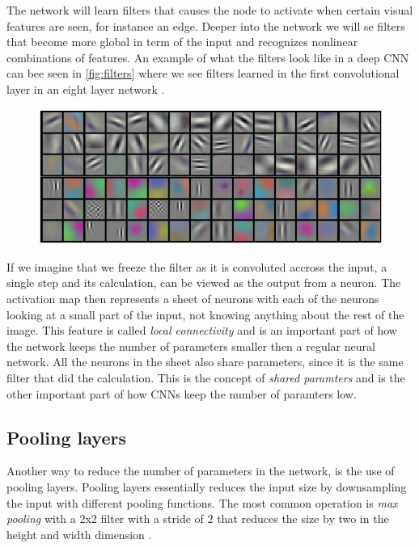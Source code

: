 The network will learn filters that causes the node to activate when certain visual features are seen, for instance an edge. Deeper into the network we will se filters that become more global in term of the input and recognizes nonlinear combinations of features. An example of what the filters look like in a deep CNN can bee seen in \autoref{fig:filters} where we see filters learned in the first convolutional layer in an eight layer network \cite{Krizhevsky2012}.

\begin{figure}[H]
	\centering
	\includegraphics[width=\linewidth]{fig/filters.png}
	\label{fig:filters}
\end{figure}
If we imagine that we freeze the filter as it is convoluted accross the input, a single step and its calculation, can be viewed as the output from a neuron. The activation map then represents a sheet of neurons with each of the neurons looking at a small part of the input, not knowing anything about the rest of the image. This feature is called \emph{local connectivity} and is an important part of how the network keeps the number of parameters smaller then a regular neural network. All the neurons in the sheet also share parameters, since it is the same filter that did the calculation. This is the concept of \emph{shared paramters} and is the other important part of how CNNs keep the number of paramters low.

\subsection{Pooling layers}
Another way to reduce the number of parameters in the network, is the use of pooling layers. Pooling layers essentially reduces the input size by downsampling the input with different pooling functions. The most common operation is \emph{max pooling} with a 2x2 filter with a stride of 2 that reduces the size by two in the height and width dimension \cite{Li}. 






















